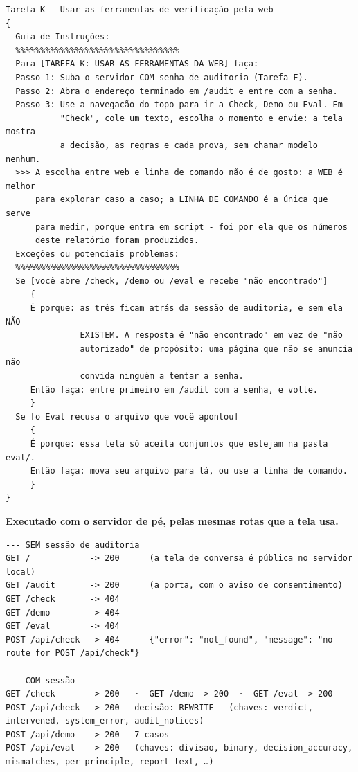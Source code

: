 \documentclass[10pt]{article}
\begin{document}
\begin{lstlisting}
Tarefa K - Usar as ferramentas de verificação pela web
{
  Guia de Instruções:
  %%%%%%%%%%%%%%%%%%%%%%%%%%%%%%%%%
  Para [TAREFA K: USAR AS FERRAMENTAS DA WEB] faça:
  Passo 1: Suba o servidor COM senha de auditoria (Tarefa F).
  Passo 2: Abra o endereço terminado em /audit e entre com a senha.
  Passo 3: Use a navegação do topo para ir a Check, Demo ou Eval. Em
           "Check", cole um texto, escolha o momento e envie: a tela mostra
           a decisão, as regras e cada prova, sem chamar modelo nenhum.
  >>> A escolha entre web e linha de comando não é de gosto: a WEB é melhor
      para explorar caso a caso; a LINHA DE COMANDO é a única que serve
      para medir, porque entra em script - foi por ela que os números
      deste relatório foram produzidos.
  Exceções ou potenciais problemas:
  %%%%%%%%%%%%%%%%%%%%%%%%%%%%%%%%%
  Se [você abre /check, /demo ou /eval e recebe "não encontrado"]
     {
     É porque: as três ficam atrás da sessão de auditoria, e sem ela NÃO
               EXISTEM. A resposta é "não encontrado" em vez de "não
               autorizado" de propósito: uma página que não se anuncia não
               convida ninguém a tentar a senha.
     Então faça: entre primeiro em /audit com a senha, e volte.
     }
  Se [o Eval recusa o arquivo que você apontou]
     {
     É porque: essa tela só aceita conjuntos que estejam na pasta eval/.
     Então faça: mova seu arquivo para lá, ou use a linha de comando.
     }
}
\end{lstlisting}

\textbf{Executado com o servidor de pé, pelas mesmas rotas que a tela usa.}

\begin{lstlisting}
--- SEM sessão de auditoria
GET /            -> 200      (a tela de conversa é pública no servidor local)
GET /audit       -> 200      (a porta, com o aviso de consentimento)
GET /check       -> 404
GET /demo        -> 404
GET /eval        -> 404
POST /api/check  -> 404      {"error": "not_found", "message": "no route for POST /api/check"}

--- COM sessão
GET /check       -> 200   ·  GET /demo -> 200  ·  GET /eval -> 200
POST /api/check  -> 200   decisão: REWRITE   (chaves: verdict, intervened, system_error, audit_notices)
POST /api/demo   -> 200   7 casos
POST /api/eval   -> 200   (chaves: divisao, binary, decision_accuracy, mismatches, per_principle, report_text, …)
\end{lstlisting}
\end{document}

